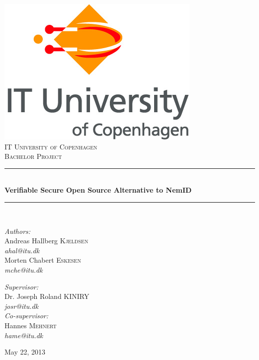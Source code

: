 \documentclass[twosided]{report}
\newcommand{\HRule}{\rule{\linewidth}{0.5mm}}
\begin{document}
\begin{titlepage}
\begin{center}

\includegraphics[scale=0.4]{images/ITULogo.jpg}\\[1cm]

\textsc{\LARGE IT University of Copenhagen}\\[1.5cm]

\textsc{\Large Bachelor Project}\\[0.5cm]


\HRule \\[0.4cm]
{\huge \bfseries Verifiable Secure Open Source Alternative to NemID}\\[0.1cm]
\HRule \\[1.5cm]

\begin{minipage}[t]{0.45\textwidth}
\begin{flushleft} \large
\emph{Authors:}
\\[10pt]
Andreas Hallberg \textsc{Kjeldsen}\\
\emph{ahal@itu.dk}
\\[10pt]
Morten Chabert \textsc{Eskesen}\\
\emph{mche@itu.dk}\\
\end{flushleft}
\end{minipage}
\begin{minipage}[t]{0.45\textwidth}
\begin{flushright} \large
\emph{Supervisor:}
\\[10pt]
Dr. Joseph Roland \textsc{KINIRY}\\
\emph{josr@itu.dk}
\\[10pt]
\emph{Co-supervisor:}
\\[10pt]
Hannes \textsc{Mehnert}\\
\emph{hame@itu.dk}
\end{flushright}
\end{minipage}

\vfill

{\large May 22, 2013}

\end{center}
\end{titlepage}
\end{document}
